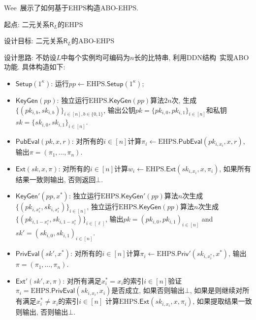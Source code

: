 Wee~\cite{Wee-CRYPTO-2010}展示了如何基于EHPS构造ABO-EHPS. 
\begin{construction}
\begin{trivlist}
	\item 起点: 二元关系$\mathsf{R}_L$的EHPS 
	\item 设计目标: 二元关系$\mathsf{R}_L$的ABO-EHPS
	\item 设计思路: 不妨设$L$中每个实例均可编码为$n$长的比特串, 利用DDN结构~\cite{DDN-STOC-1991}实现ABO功能. 具体构造如下:
	
	\begin{itemize}
		\item $\mathsf{Setup}(1^\kappa)$: 运行$pp \leftarrow \text{EHPS}.\mathsf{Setup}(1^\kappa)$;

		\item $\mathsf{KeyGen}(pp)$: 独立运行$\text{EHPS}.\mathsf{KeyGen}(pp)$算法$2n$次, 
			生成$\{(pk_{i,b}, sk_{i,b})\}_{i \in [n], b \in \{0,1\}}$, 
			输出公钥$pk = \{pk_{i,0}, pk_{i,1}\}_{i \in [n]}$和私钥$sk = \{sk_{i,0}, sk_{i,1}\}_{i \in [n]}$. 

		\item $\mathsf{PubEval}(pk, x, r)$: 对所有的$i \in [n]$计算$\pi_i \leftarrow \text{EHPS}.\mathsf{PubEval}(pk_{i, x_i}, x, r)$, 
			输出$\pi = (\pi_1, \dots, \pi_n)$. 

		\item $\mathsf{Ext}(sk, x, \pi)$: 对所有的$i \in [n]$计算$w_i \leftarrow \text{EHPS}.\mathsf{Ext}(sk_{i, x_i}, x, \pi_i)$,   
			如果所有结果一致则输出, 否则返回$\bot$. 

		\item $\mathsf{KeyGen}'(pp, x^*)$: 独立运行$\text{EHPS}.\mathsf{KeyGen}'(pp)$算法$n$次生成$\{(pk_{i,x^*_i}, sk_{i,x^*_i})\}_{i \in [n]}$, 
    		独立运行$\text{EHPS}.\mathsf{KeyGen}(pp)$算法$n$次生成$\{(pk_{i,1-x^*_i}, sk_{i,1-x^*_i})\}_{i \in [\ell]}$, 
    		输出$pk = (pk_{i,0}, pk_{i,1})_{i \in [n]}$ and $sk' = (sk_{i,0}, sk_{i,1})_{i \in [n]}$.

		\item $\mathsf{PrivEval}(sk', x^*)$: 对所有的$i \in [n]$计算$\pi_i \leftarrow \text{EHPS}.\mathsf{Priv}'(sk_{i, x^*_i}, x^*)$, 
    		输出$\pi = (\pi_1, \dots, \pi_n)$. 

		\item $\mathsf{Ext}'(sk', x, \pi)$: 对所有满足$x_i^* = x_i$的索引$i \in [n]$验证
			$\pi_i = \text{EHPS}.\mathsf{PrivEval}(sk_{i,x_i}, x_i)$是否成立, 
			如果否则输出$\bot$, 如果是则继续对所有满足$x_i^* \neq x_i$的索引$i \in [n]$
			计算$\text{EHPS}.\mathsf{Ext}(sk_{i, x_i}, x, \pi_i)$, 如果提取结果一致则输出, 否则输出$\bot$. 
	\end{itemize}
\end{trivlist}
\end{construction}


